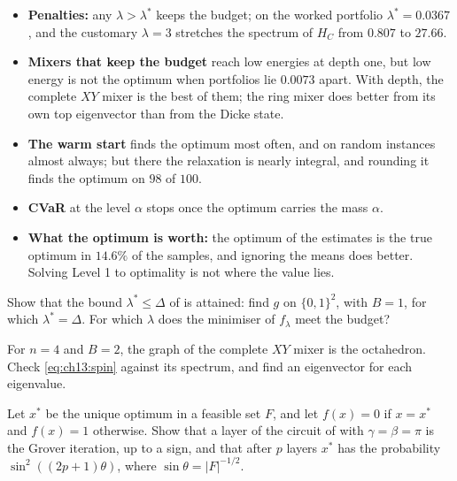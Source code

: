 \documentclass[handoutsbeamer.tex]{subfiles}
\begin{document}
\begin{frame}
\onp{\small}
\begin{itemize}\setlength\itemsep{0.35em}
    \item \textbf{Penalties:} any $\lambda>\lambda^*$ keeps the budget; on the worked portfolio $\lambda^* = 0.0367$, and the customary $\lambda = 3$ stretches the spectrum of $H_C$ from $0.807$ to $27.66$.
    \item \textbf{Mixers that keep the budget} reach low energies at depth one, but low energy is not the optimum when portfolios lie $0.0073$ apart. With depth, the complete $XY$ mixer is the best of them; the ring mixer does better from its own top eigenvector than from the Dicke state.
    \item \textbf{The warm start} finds the optimum most often, and on random instances almost always; but there the relaxation is nearly integral, and rounding it finds the optimum on $98$ of $100$.
    \item \textbf{CVaR} at the level $\alpha$ stops once the optimum carries the mass $\alpha$.
    \item \textbf{What the optimum is worth:} the optimum of the estimates is the true optimum in $14.6\%$ of the samples, and ignoring the means does better. Solving Level 1 to optimality is not where the value lies.
\end{itemize}
\end{frame}


\begin{frame}
\onp{\footnotesize}
\begin{exe}\label{exe:ch13:penalty}
Show that the bound $\lambda^*\le\Delta$ of  is attained: find $g$ on $\{0,1\}^2$, with $B = 1$, for which $\lambda^* = \Delta$. For which $\lambda$ does the minimiser of $f_\lambda$ meet the budget?
\end{exe}
\begin{exe}\label{exe:ch13:octa}
For $n = 4$ and $B = 2$, the graph of the complete $XY$ mixer is the octahedron. Check \eqref{eq:ch13:spin} against its spectrum, and find an eigenvector for each eigenvalue.
\end{exe}
\begin{exe}\label{exe:ch13:grover}
Let $x^*$ be the unique optimum in a feasible set $F$, and let $f(x) = 0$ if $x = x^*$ and $f(x) = 1$ otherwise. Show that a layer of the circuit of  with $\gamma = \beta = \pi$ is the Grover iteration, up to a sign, and that after $p$ layers $x^*$ has the probability $\sin^2((2p+1)\theta)$, where $\sin\theta = |F|^{-1/2}$.
\end{exe}
\end{frame}
\end{document}
